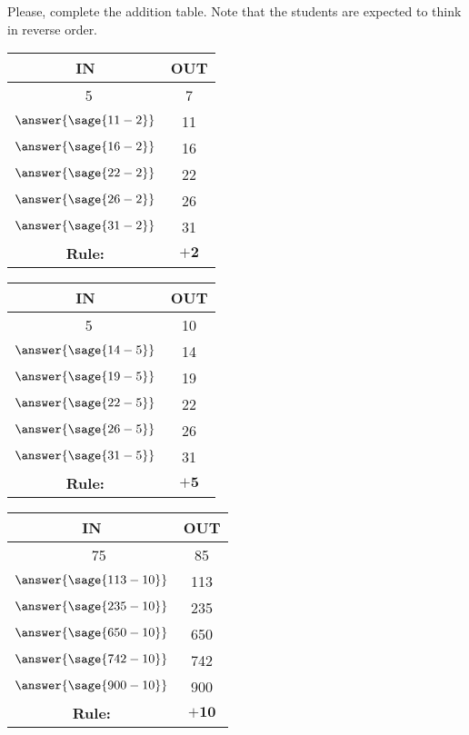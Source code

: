 \documentclass{ximera}
\begin{document}
\begin{problem}
Please, complete the addition table. Note that the students are expected to think in reverse order.

\begin{tabular}[c]{|c|c|}
\hline
 IN & OUT \\
 \hline
 ~5 & 7 \\
 \hline
 $\answer{\sage{11-2}}$ & 11 \\
 \hline
 $\answer{\sage{16-2}}$  & 16 \\
 \hline
 $\answer{\sage{22-2}}$  & 22 \\
 \hline
  $\answer{\sage{26-2}}$ & 26 \\
 \hline
  $\answer{\sage{31-2}}$ & 31 \\
 \hline
 \textbf{Rule:} & $\mathbf{+2}$ \\
 \hline
\end{tabular}
\hfill
\begin{tabular}[c]{|c|c|}
\hline
 IN & OUT \\
 \hline
 ~5 & 10 \\
 \hline
  $\answer{\sage{14-5}}$ & 14 \\
 \hline
 $\answer{\sage{19-5}}$  & 19 \\
 \hline
 $\answer{\sage{22-5}}$  & 22 \\
 \hline
 $\answer{\sage{26-5}}$  & 26 \\
 \hline
 $\answer{\sage{31-5}}$  & 31 \\
 \hline
 \textbf{Rule:} & $\mathbf{+5}$ \\
 \hline
\end{tabular}
\hfill
\begin{tabular}[c]{|c|c|}
\hline
 IN & OUT \\
 \hline
 ~~75 & 85 \\
 \hline
 $\answer{\sage{113-10}}$  & 113 \\
 \hline
 $\answer{\sage{235-10}}$  & 235 \\
 \hline
 $\answer{\sage{650-10}}$  & 650 \\
 \hline
 $\answer{\sage{742-10}}$  & 742 \\
 \hline
 $\answer{\sage{900-10}}$  & 900 \\
 \hline
 \textbf{Rule:} & $\mathbf{+10}$ \\
 \hline
\end{tabular}
\end{problem}
\end{document}
